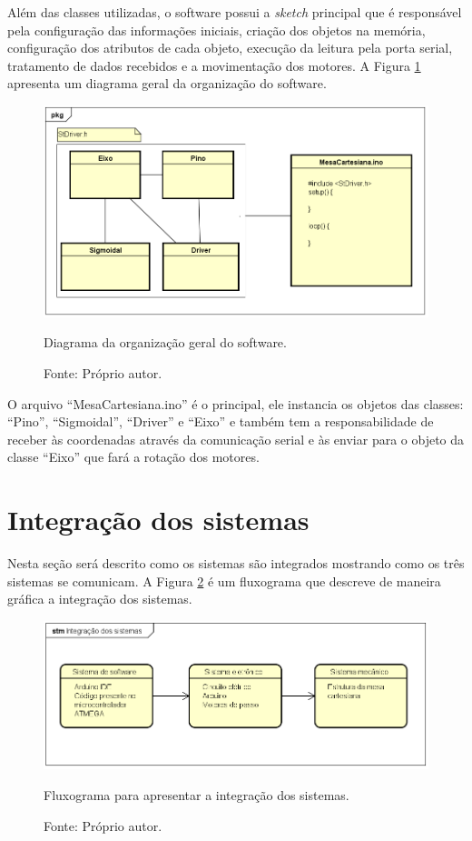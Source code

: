 Além das classes utilizadas, o software possui a \textit{sketch} principal que é responsável pela configuração das 
informações iniciais, criação dos objetos na memória, configuração dos atributos de cada objeto, execução 
da leitura pela porta serial, tratamento de dados recebidos e a movimentação dos motores.
A Figura \ref{fig:orgsoftware} apresenta um diagrama geral da organização do software.

\begin{figure}[H]
\centering
\includegraphics[width = 1\linewidth]{figuras/orgsoftware}
\caption{Diagrama da organização geral do software.}
\caption*{Fonte: Próprio autor.}
\label{fig:orgsoftware}
\end{figure}
    
O arquivo “MesaCartesiana.ino” é o principal, ele instancia os objetos das classes: “Pino”, “Sigmoidal”, 
“Driver” e “Eixo” e também tem a responsabilidade de receber às coordenadas através da comunicação serial 
e às enviar para o objeto da classe “Eixo” que fará a rotação dos motores.

\section{Integração dos sistemas}\label{subsec:metintegracao}

Nesta seção será descrito como os sistemas são integrados mostrando como os três sistemas se comunicam. 
A Figura \ref{fig:integracao} é um fluxograma que descreve de maneira gráfica a integração dos sistemas.

\begin{figure}[H]
\centering
\includegraphics[width = 1\linewidth]{figuras/integracao}
\caption{Fluxograma para apresentar a integração dos sistemas.}
\caption*{Fonte: Próprio autor.}
\label{fig:integracao}
\end{figure}
    
